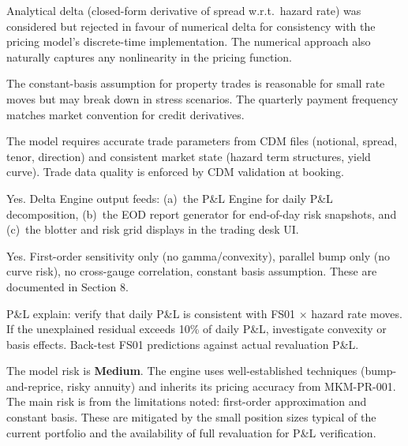 \documentclass[11pt,a4paper]{article}
\begin{document}

Analytical delta (closed-form derivative of spread w.r.t.\ hazard rate) was considered but rejected in favour of numerical delta for consistency with the pricing model's discrete-time implementation. The numerical approach also naturally captures any nonlinearity in the pricing function.


The constant-basis assumption for property trades is reasonable for small rate moves but may break down in stress scenarios. The quarterly payment frequency matches market convention for credit derivatives.


The model requires accurate trade parameters from CDM files (notional, spread, tenor, direction) and consistent market state (hazard term structures, yield curve). Trade data quality is enforced by CDM validation at booking.


Yes. Delta Engine output feeds: (a)~the P\&L Engine for daily P\&L decomposition, (b)~the EOD report generator for end-of-day risk snapshots, and (c)~the blotter and risk grid displays in the trading desk UI.


Yes. First-order sensitivity only (no gamma/convexity), parallel bump only (no curve risk), no cross-gauge correlation, constant basis assumption. These are documented in Section 8.


P\&L explain: verify that daily P\&L is consistent with FS01 $\times$ hazard rate moves. If the unexplained residual exceeds 10\% of daily P\&L, investigate convexity or basis effects. Back-test FS01 predictions against actual revaluation P\&L.


The model risk is \textbf{Medium}. The engine uses well-established techniques (bump-and-reprice, risky annuity) and inherits its pricing accuracy from MKM-PR-001. The main risk is from the limitations noted: first-order approximation and constant basis. These are mitigated by the small position sizes typical of the current portfolio and the availability of full revaluation for P\&L verification.

\clearpage

\mkmchangelog

\end{document}
